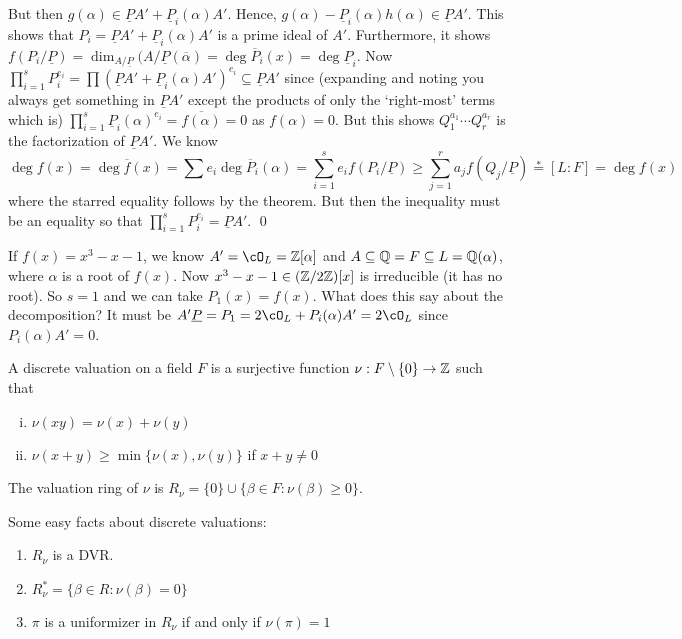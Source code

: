 But then $g(\alpha) \in \underline{P}A' + \underline{P}_i(\alpha)A'$. Hence, $g(\alpha) - \underline{P}_i(\alpha)h(\alpha) \in \underline{P}A'$. This shows that $P_i=\underline{P}A' + \underline{P}_i(\alpha)A'$ is a prime ideal of $A'$. Furthermore, it shows $f(P_i/\underline{P})=\dim_{A/\underline{P}}(A/\underline{P}(\overline{\alpha})=\deg \overline{P}_i(x)=\deg \underline{P}_i$. Now $\prod_{i=1}^s P_i^{e_i}= \prod (\underline{P}A' + \underline{P}_i(\alpha)A')^{e_i} \subseteq \underline{P}A'$ since (expanding and noting you always get something in $\underline{P}A'$ except the products of only the `right-most' terms which is) $\prod_{i=1}^s \underline{P}_i(\alpha)^{e_i}= \overline{f(\alpha)} =0$ as $f(\alpha)=0$. But this shows $Q_1^{a_1} \cdots Q_r^{a_r}$ is the factorization of $\underline{P}A'$. We know
	\[
	\deg f(x)=\deg\overline{f}(x)=\sum e_i \deg \overline{P}_i(\alpha)=\sum_{i=1}^s e_i f(P_i/\underline{P}) \geq \sum_{j=1}^r a_j f(Q_j/\underline{P}) \stackrel{*}{=}[L:F]=\deg f(x)
	\]
where the starred equality follows by the theorem. But then the inequality must be an equality so that $\prod_{i=1}^s P_i^{e_i} = \underline{P}A'$. \qed \\


\begin{ex}
If $f(x)=x^3-x-1$, we know $A'=\cO_L=\Z[\alpha]$ and $A \subseteq \mathbb{Q}=F \subseteq L=\mathbb{Q}(\alpha)$, where $\alpha$ is a root of $f(x)$. Now $x^3-x-1 \in (\mathbb{Z}/2\mathbb{Z})[x]$ is irreducible (it has no root). So $s=1$ and we can take $P_1(x)=f(x)$. What does this say about the decomposition? It must be $A'\underline{P}= P_1=2 \cO_L+ P_i(\alpha)A'=2 \cO_L$ since $P_i(\alpha)A'=0$.
\end{ex}


\begin{dfn}
A discrete valuation on a field $F$ is a surjective function $\nu: F \setminus \{0\} \to \mathbb{Z}$ such that
	\begin{enumerate}[(i)]
	\item $\nu(xy)=\nu(x)+\nu(y)$
	\item $\nu(x+y) \geq \min\{\nu(x),\nu(y)\}$ if $x+y \neq 0$
	\end{enumerate}
The valuation ring of $\nu$ is $R_\nu=\{0\} \cup \{\beta \in F \colon \nu(\beta) \geq 0\}$. 
\end{dfn}


Some easy facts about discrete valuations:
	\begin{enumerate}[1.]
	\item $R_\nu$ is a DVR.
	\item $R_\nu^*=\{\beta \in R \colon \nu(\beta)=0\}$
	\item $\pi$ is a uniformizer in $R_\nu$ if and only if $\nu(\pi)=1$
	\end{enumerate}


